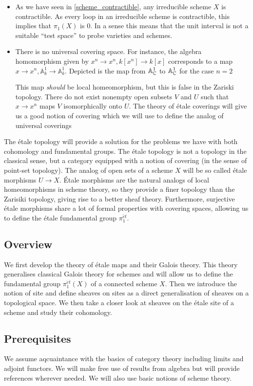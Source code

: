 \begin{itemize}
  \item  As we have seen in \ref{scheme_contractible}, any irreducible scheme $X$ is contractible. As every loop in an irreducible scheme is contractible, this implies that $\pi_1(X)$ is $0$. In a sense this means that the unit interval is not a suitable ``test space'' to probe varieties and schemes.
  \item There is no universal covering space.
        For instance, the algebra homomorphism given by $x^n \to x^n, k[x^n] \to k[x]$ corresponds to a map $x \to x^n, \mathbb{A}^1_k \to \mathbb{A}^1_k$. Depicted is the map from $\mathbb{A}^1_{\mathbb{C}}$ to $\mathbb{A}^1_{\mathbb{C}}$ for the case $n=2$

        
        This map \textit{should} be local homeomorphism, but this is false in the Zariski topology. There do not exist nonempty open subsets $V$ and $U$ such that $x \to x^n$ maps $V$ isomorphically onto $U$. The theory of \'etale coverings will give us a good notion of covering which we will use to define the analog of universal coverings
\end{itemize}
The \'etale topology will provide a solution for the problems we have with both cohomology and fundamental groups. The \'etale topology is not a topology in the classical sense, but a category equipped with a notion of covering (in the sense of point-set topology). The analog of open sets of a scheme $X$ will be so called \'etale morphisms $U \to X$. \'Etale morphisms are the natural analogs of local homeomorphisms in scheme theory, so they provide a finer topology than the Zarisiki topology, giving rise to a better sheaf theory. Furthermore, surjective \'etale morphisms share a lot of formal properties with covering spaces, allowing us to define the \'etale fundamental group $\pi_1^{\acute{e}t}$.

\subsection{Overview}
We first develop the theory of \'etale maps and their Galois theory. This theory generalises classical Galois theory for schemes and will allow us to define the fundamental group $\pi_1^{\acute{e}t}(X)$ of a connected scheme $X$. Then we introduce the notion of site and define sheaves on sites as a direct generalisation of sheaves on a topological space. We then take a closer look at sheaves on the \'etale site of a scheme and study their cohomology.
\subsection{Prerequisites}
We assume aqcuaintance with the basics of category theory including limits and adjoint functors. We will make free use of results from algebra but will provide references wherever needed. We will also use basic notions of scheme theory.

%
